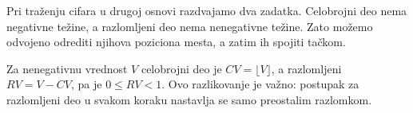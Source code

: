
Pri traženju cifara u drugoj osnovi razdvajamo dva zadatka. Celobrojni deo nema negativne težine, a razlomljeni deo nema nenegativne težine. Zato možemo odvojeno odrediti njihova poziciona mesta, a zatim ih spojiti tačkom.

Za nenegativnu vrednost $V$ celobrojni deo je $CV=\lfloor V\rfloor$, a razlomljeni $RV=V-CV$, pa je $0\leq RV<1$. Ovo razlikovanje je važno: postupak za razlomljeni deo u svakom koraku nastavlja se samo preostalim razlomkom.
